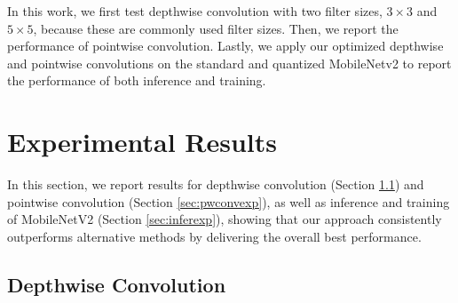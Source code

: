 In this work, we first test depthwise convolution with two filter sizes, $3 \times 3$ and $5 \times 5$, because these are commonly used
filter sizes. Then, we report the performance of pointwise convolution. Lastly, we apply our optimized depthwise and pointwise convolutions
on the standard and quantized MobileNetv2 to report the performance of both inference and training.
%

\section{Experimental Results}
\label{exp} In this section, we report results for depthwise convolution (Section \ref{sec:depconvexp}) and pointwise convolution (Section
\ref{sec:pwconvexp}), as well as inference and training of MobileNetV2 (Section \ref{sec:inferexp}), showing that our approach consistently
outperforms alternative methods by delivering the overall best performance.


\subsection{Depthwise Convolution}
\label{sec:depconvexp}

